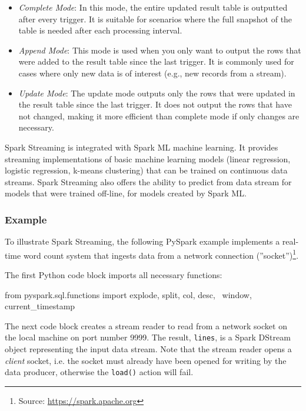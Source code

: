\begin{itemize}
\item \emph{Complete Mode}: In this mode, the entire updated result table is outputted after every trigger. It is suitable for scenarios where the full snapshot of the table is needed after each processing interval.

\item \emph{Append Mode}: This mode is used when you only want to output the rows that were added to the result table since the last trigger. It is commonly used for cases where only new data is of interest (e.g., new records from a stream).

\item \emph{Update Mode}: The update mode outputs only the rows that were updated in the result table since the last trigger. It does not output the rows that have not changed, making it more efficient than complete mode if only changes are necessary.
\end{itemize}

Spark Streaming is integrated with Spark ML machine learning. It provides streaming implementations of basic machine learning models (linear regression, logistic regression, k-means clustering) that can be trained on continuous data streams. Spark Streaming also offers the ability to predict from data stream for models that were trained off-line, for models created by Spark ML.

\subsubsection*{Example}

To illustrate Spark Streaming, the following PySpark example implements a real-time word count system that ingests data from a network connection (''socket'')\footnote{Source: \url{https://spark.apache.org}}.

The first Python code block imports all necessary functions:

\begin{samepage}
\begin{pythoncode}
from pyspark.sql.functions import explode, split, col, desc, \
    window, current_timestamp
\end{pythoncode}
\end{samepage}

The next code block creates a stream reader to read from a network socket on the local machine on port number 9999. The result, \texttt{lines}, is a Spark DStream object representing the input data stream. Note that the stream reader opens a \emph{client} socket, i.e. the socket must already have been opened for writing by the data producer, otherwise the \texttt{load()} action will fail.

